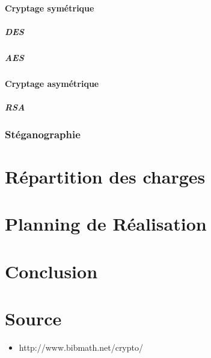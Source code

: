 \documentclass[a4paper,12pt]{article}
\begin{document}
			\subsection{Cryptage symétrique}
			\subsubsection{DES}
			\subsubsection{AES}

			\subsection{Cryptage asymétrique}
			\subsubsection{RSA}
		
		\section{Stéganographie}
	\newpage
	\part{Répartition des charges}
	\newpage	
	\part{Planning de Réalisation} %
	\newpage
	\part{Conclusion}
	\newpage
	\part*{Source}
		\begin{itemize}
			\item  http://www.bibmath.net/crypto/
		\end{itemize}
\end{document}
